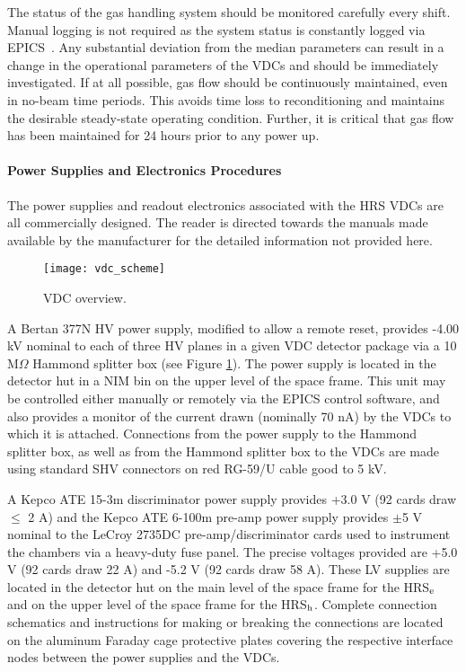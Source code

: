 {The status of the gas handling system should be monitored carefully
every shift.  Manual logging is not required as the system status is
constantly logged via EPICS~\cite{EPICSwww}.  Any substantial deviation from the
median parameters can result in a change in the operational parameters
of the VDCs and should be immediately investigated.  If at all
possible, gas flow should be continuously maintained, even in
no-beam time periods.   This avoids time loss to reconditioning and
maintains the desirable steady-state operating condition.  Further,
it is critical that gas flow has been maintained for 24 hours prior
to any power up.

\paragraph{Power Supplies and Electronics Procedures}
\label{lv}

The power supplies and readout electronics associated with the HRS
VDCs are all commercially designed.  The reader is directed towards
the manuals made available by the manufacturer for the detailed
information not provided here.


\begin{figure}
\begin{center}
\texttt{[image: vdc\_scheme]}
\caption[Detectors: VDC Overview]{VDC overview.}
\label{fig:vdcscheme}
\end{center}
\end{figure}

A Bertan 377N HV power supply, modified to allow a remote reset,
provides -4.00 kV nominal to
each of three HV planes in a given VDC detector package via a
10 M$\Omega$ Hammond splitter box (see Figure \ref{fig:vdcscheme}).
The power supply is located in
the detector hut in a NIM bin on the upper level of the space frame.
This unit may be controlled either manually or remotely via the
EPICS control software, and also provides a monitor of the
current drawn (nominally 70 nA) by the VDCs to which it is attached.
Connections from the power supply to the Hammond splitter box, as
well as from the Hammond splitter box to the VDCs are made using
standard SHV connectors on red RG-59/U cable good to 5 kV.

A Kepco ATE 15-3m discriminator power supply provides +3.0 V (92 cards
draw $\leq$ 2 A) and the Kepco ATE 6-100m pre-amp power supply provides 
$\pm$5 V nominal to the LeCroy 2735DC pre-amp/discriminator cards used 
to instrument the chambers via a heavy-duty fuse panel.  The precise 
voltages provided are +5.0 V (92 cards draw 22 A) and -5.2 V (92 cards 
draw 58 A).  These LV supplies are located in the detector hut on the 
main level of the space frame for the HRS$_{\rm e}$ and on the upper 
level of the space frame for the HRS$_{\rm h}$.
Complete connection schematics and instructions
for making or breaking the connections are located on the aluminum
Faraday cage protective plates covering the respective interface
nodes between the power supplies and the VDCs.

}
